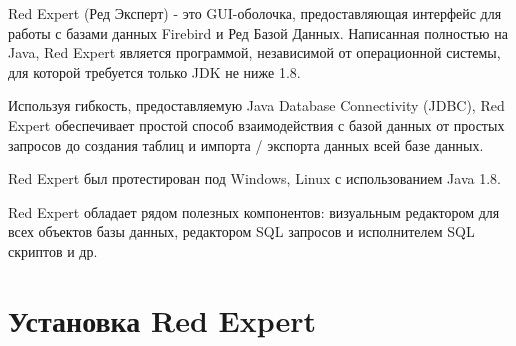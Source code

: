 





Red Expert (Ред Эксперт) - это GUI-оболочка, предоставляющая интерфейс для работы с базами данных Firebird и Ред Базой Данных. Написанная полностью на Java, Red Expert является программой, независимой от операционной системы, для которой требуется только JDK не ниже 1.8.

Используя гибкость, предоставляемую Java Database Connectivity (JDBC), Red Expert обеспечивает простой способ взаимодействия с базой данных от простых запросов до создания таблиц и импорта / экспорта данных всей базе данных.

Red Expert был протестирован под Windows, Linux с использованием Java 1.8.

Red Expert обладает рядом полезных компонентов: визуальным редактором для всех объектов базы данных, редактором SQL запросов и исполнителем SQL скриптов и др.

\newpage

\section{Установка Red Expert}

